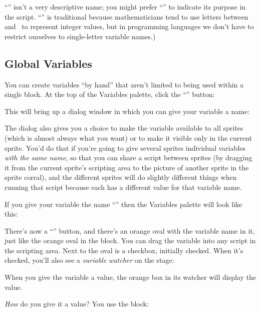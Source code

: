 \documentclass{report}
\begin{document}
``'' isn't a very descriptive name; you might prefer ``'' to indicate its purpose in the script. ``'' is traditional because mathematicians tend to use letters between~ and~ to represent integer values, but in programming languages we don't have to restrict ourselves to single-letter variable names.)

\subsection{Global Variables}

You can create variables ``by hand'' that aren't limited to being used within a single block. At the top of the Variables palette, click the ``'' button:\nopagebreak


This will bring up a dialog window in which you can give your variable a name:\nopagebreak


The dialog also gives you a choice to make the variable available to all sprites (which is almost always what you want) or to make it visible only in the current sprite. You'd do that if you're going to give several sprites individual variables \emph{with the same name}, so that you can share a script between sprites (by dragging it from the current sprite's scripting area to the picture of another sprite in the sprite corral), and the different sprites will do slightly different things when running that script because each has a different value for that variable name.

If you give your variable the name ``'' then the Variables palette will look like this:\nopagebreak


There's now a ``'' button, and there's an orange oval with the variable name in it, just like the orange oval in the  block. You can drag the variable into any script in the scripting area. Next to the oval is a checkbox, initially checked. When it's checked, you'll also see a \emph{variable watcher} on the stage:\nopagebreak


When you give the variable a value, the orange box in its watcher will display the value.

\emph{How} do you give it a value? You use the  block:\nopagebreak
\end{document}
